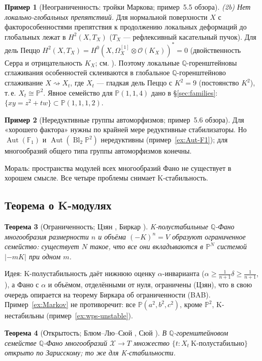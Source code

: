 \documentclass[11pt,a4paper]{article}
\theoremstyle{plain}
\newtheorem{theorem}{Теорема}[section]
\theoremstyle{definition}
\newtheorem{example}[theorem]{Пример}
\theoremstyle{remark}
\newcommand{\Q}{\mathbb{Q}}
\newcommand{\PP}{\mathbb{P}}
\newcommand{\cO}{\mathcal{O}}
\newcommand{\cX}{\mathcal{X}}
\DeclareMathOperator{\Bl}{Bl}
\DeclareMathOperator{\Aut}{Aut}
\begin{document}
\begin{example}[Неограниченность: тройки Маркова; пример~5.5 обзора]
\emph{(2b) Нет локально-глобальных препятствий.} Для нормальной поверхности $X$ с
факторособенностями препятствия к продолжению локальных деформаций до глобальных лежат в
$H^2(X,T_X)$ ($T_X$ --- рефлексивный касательный пучок). Для дель Пеццо $H^2(X,T_X)=H^0(X,\Omega^{[1]}_X\otimes\cO(K_X))^*=0$
(двойственность Серра и отрицательность $K_X$; см. \cite[Prop.~3.1]{HP}). Поэтому локальные
$\Q$-горенштейновы сглаживания особенностей склеиваются в глобальное $\Q$-горенштейново сглаживание
$X\rightsquigarrow X_t$, где $X_t$ --- гладкая дель Пеццо с $K^2=9$ (постоянство $K^2$), т.\,е.
$X_t\cong\PP^2$. Явное семейство для $\PP(1,1,4)$ дано в \S\ref{sec:families}: $\{xy=z^2+tw\}\subset\PP(1,1,1,2)$.
\end{example}

\begin{example}[Нередуктивные группы автоморфизмов; пример~5.6 обзора]
Для «хорошего фактора» нужны по крайней мере редуктивные стабилизаторы. Но $\Aut(\mathbb F_1)$ и
$\Aut(\Bl_2\PP^2)$ нередуктивны (пример~\ref{ex:Aut-F1}); для многообразий общего типа группы
автоморфизмов конечны.
\end{example}

Мораль: пространства модулей всех многообразий Фано не существует в хорошем смысле. Все четыре
проблемы снимает K-стабильность.

\subsection{Теорема о K-модулях}

\begin{theorem}[{Ограниченность; Цзян \cite{Jia20}, Биркар \cite{Bir19}}]\label{thm:boundedness}
K-полустабильные $\Q$-Фано многообразия размерности $n$ и объёма $(-K)^n=V$ образуют ограниченное
семейство: существует $N$ такое, что все они вкладываются в $\PP^N$ системой $|-mK|$ при одном $m$.
\end{theorem}

Идея: K-полустабильность даёт нижнюю оценку $\alpha$-инварианта ($\alpha\ge\frac1{n+1}\delta\ge\frac1{n+1}$,
\cite{BJ}), а Фано с $\alpha$ и объёмом, отделёнными от нуля, ограничены (Цзян), что в свою очередь
опирается на теорему Биркара об ограниченности (BAB). Пример~\ref{ex:Markov} не противоречит:
все $\PP(a^2,b^2,c^2)$, кроме $\PP^2$, K-нестабильны (пример~\ref{ex:wps-unstable}).

\begin{theorem}[{Открытость; Блюм--Лю--Сюй \cite{BLX}, Сюй \cite{Xu20}}]\label{thm:openness}
В $\Q$-горенштейновом семействе $\Q$-Фано многообразий $\cX\to T$ множество $\{t: X_t\ \text{K-полустабильно}\}$
открыто по Зарисскому; то же для K-стабильности.
\end{theorem}
\end{document}
